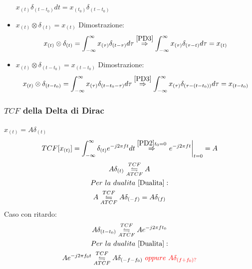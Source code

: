 \begin{itemize}
{                        $x_{(t)}\delta_{(t-t_0)} dt = x_{(t_0)}\delta_{(t-t_0)}  $
                    }\label{PD4}
                    \item {
                        $x_{(t)} \otimes \delta_{(t)} = x_{(t)}$
                        Dimostrazione:
                        \[x_{(t)} \otimes \delta_{(t)} = \int_{-\infty}^{\infty}x_{(\tau)}\delta_{(t-\tau)} d\tau \overset{\ref{PD3}}{\Rightarrow} \int_{-\infty}^{\infty}x_{(\tau)}\delta_{(\tau-t)} d\tau = x_{(t)}\]
                    }\label{PD5}
                    \item {
                        $x_{(t)} \otimes \delta_{(t-t_0)} = x_{(t-t_0)}$
                        Dimostrazione:
                        \[x_{(t)} \otimes \delta_{(t-t_0)} = \int_{-\infty}^{\infty}x_{(\tau)}\delta_{(t-t_0-\tau)} d\tau \overset{\ref{PD3}}{\Rightarrow} \int_{-\infty}^{\infty}x_{(\tau)}\delta_{(\tau-(t-t_0))} d\tau = x_{(t-t_0)}\]
                    }\label{PD6}
                \end{itemize}
        \subsubsection{$TCF$ della Delta di Dirac}\label{TCF della Delta di Dirac}
                $x_{(t)} = A\delta_{(t)}$
                \[
                    TCF[x_{(t)}] = \int_{-\infty}^{\infty}\delta_{(t)}e^{-j2\pi ft} dt \overset{\ref{PD2} t_0=0}{\Rightarrow} \eval{e^{-j2\pi ft}}_{t=0} = A
                \]
                \begin{gather}
                        A\delta_{(t)} \overunderset{TCF}{ATCF}{\leftrightharpoons} A \nonumber \\
                        Per\ la\ dualita\ \ref{Dualita}: \nonumber \\
                        A \overunderset{TCF}{ATCF}{\leftrightharpoons} A\delta_{(-f)} = A\delta_{(f)}  \nonumber 
                \end{gather}
                Caso con ritardo:
                \begin{gather}
                    A\delta_{(t-t_0)} \overunderset{TCF}{ATCF}{\leftrightharpoons} Ae^{-j2\pi ft_0} \nonumber \\
                    Per\ la\ dualita\ \ref{Dualita}: \nonumber \\
                    Ae^{-j2\pi f_0t} \overunderset{TCF}{ATCF}{\leftrightharpoons} A\delta_{(-f-f_0)} {\color{red}\ oppure\ A\delta_{(f+f_0)?}} \nonumber 
                \end{gather}